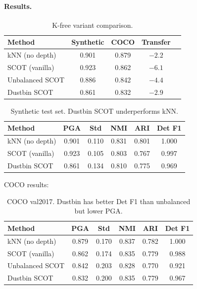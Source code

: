 \paragraph{Results.}

\begin{table}[H]
\centering
\footnotesize
\begin{tabular}{lcccc}
\toprule
Method & Synthetic & COCO & Transfer \\
\midrule
kNN (no depth) & 0.901 & 0.879 & $-2.2$ \\
SCOT (vanilla) & 0.923 & 0.862 & $-6.1$ \\
Unbalanced SCOT & 0.886 & 0.842 & $-4.4$ \\
Dustbin SCOT & 0.861 & 0.832 & $-2.9$ \\
\bottomrule
\end{tabular}
\caption{K-free variant comparison.}
\end{table}

\begin{table}[H]
\centering
\footnotesize
\begin{tabular}{lccccc}
\toprule
Method & PGA & Std & NMI & ARI & Det F1 \\
\midrule
kNN (no depth) & 0.901 & 0.110 & 0.831 & 0.801 & 1.000 \\
SCOT (vanilla) & 0.923 & 0.105 & 0.803 & 0.767 & 0.997 \\
Dustbin SCOT & 0.861 & 0.134 & 0.810 & 0.775 & 0.969 \\
\bottomrule
\end{tabular}
\caption{Synthetic test set. Dustbin SCOT underperforms kNN.}
\end{table}

COCO results:

\begin{table}[H]
\centering
\footnotesize
\begin{tabular}{lccccc}
\toprule
Method & PGA & Std & NMI & ARI & Det F1 \\
\midrule
kNN (no depth) & 0.879 & 0.170 & 0.837 & 0.782 & 1.000 \\
SCOT (vanilla) & 0.862 & 0.174 & 0.835 & 0.779 & 0.988 \\
Unbalanced SCOT & 0.842 & 0.203 & 0.828 & 0.770 & 0.921 \\
Dustbin SCOT & 0.832 & 0.200 & 0.835 & 0.779 & 0.967 \\
\bottomrule
\end{tabular}
\caption{COCO val2017. Dustbin has better Det F1 than unbalanced but lower PGA.}
\end{table}


